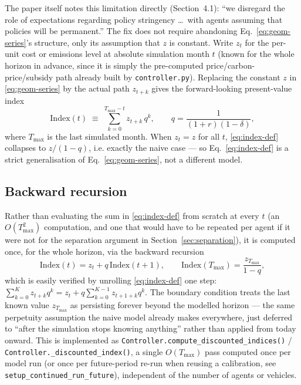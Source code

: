 \documentclass[11pt]{article}
\newcommand{\code}[1]{\texttt{#1}}
\begin{document}
The paper itself notes this limitation directly (Section~4.1): ``we
disregard the role of expectations regarding policy stringency \ldots\ with
agents assuming that policies will be permanent.'' The fix does not require
abandoning Eq.~\eqref{eq:geom-series}'s structure, only its assumption that
$z$ is constant. Write $z_t$ for the per-unit cost or emissions level at
absolute simulation month $t$ (known for the whole horizon in advance,
since it is simply the pre-computed price/carbon-price/subsidy path already
built by \code{controller.py}). Replacing the constant $z$ in
\eqref{eq:geom-series} by the actual path $z_{t+k}$ gives the
forward-looking present-value index
\begin{equation}
  \mathrm{Index}(t) \;\equiv\; \sum_{k=0}^{T_{\max}-t} z_{t+k}\, q^{k},
  \qquad q = \frac{1}{(1+r)(1-\delta)},
  \label{eq:index-def}
\end{equation}
where $T_{\max}$ is the last simulated month. When $z_t = z$ for all $t$,
\eqref{eq:index-def} collapses to $z/(1-q)$, i.e. exactly the naive case ---
so Eq.~\eqref{eq:index-def} is a strict generalisation of
Eq.~\eqref{eq:geom-series}, not a different model.

\subsection{Backward recursion}

Rather than evaluating the sum in \eqref{eq:index-def} from scratch at every
$t$ (an $O(T_{\max}^2)$ computation, and one that would have to be repeated
per agent if it were not for the separation argument in
Section~\ref{sec:separation}), it is computed once, for the whole horizon,
via the backward recursion
\begin{equation}
  \mathrm{Index}(t) = z_t + q\,\mathrm{Index}(t+1),
  \qquad
  \mathrm{Index}(T_{\max}) = \frac{z_{T_{\max}}}{1-q},
  \label{eq:backward-recursion}
\end{equation}
which is easily verified by unrolling \eqref{eq:index-def} one step:
$\sum_{k=0}^{K} z_{t+k} q^k = z_t + q \sum_{k=0}^{K-1} z_{t+1+k} q^{k}$. The
boundary condition treats the last known value $z_{T_{\max}}$ as persisting
forever beyond the modelled horizon --- the same perpetuity assumption the
naive model already makes everywhere, just deferred to ``after the
simulation stops knowing anything'' rather than applied from today onward.
This is implemented as \code{Controller.compute\_discounted\_indices()} /
\code{Controller.\_discounted\_index()}, a single $O(T_{\max})$ pass computed
once per model run (or once per future-period re-run when reusing a
calibration, see \code{setup\_continued\_run\_future}), independent of the
number of agents or vehicles.
\end{document}
